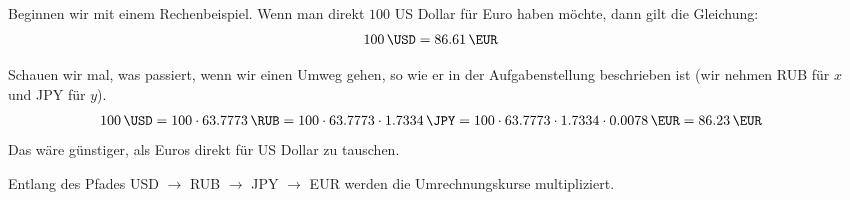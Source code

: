 \documentclass[
a4paper, %
11pt,
]
{scrartcl}
\begin{document}
Beginnen wir mit einem Rechenbeispiel. Wenn man direkt $100$ US Dollar für Euro
haben möchte, dann gilt die Gleichung:
\begin{align*}
  \SI{100}{\USD} & = \SI{86,61}{\EUR}
\end{align*}

Schauen wir mal, was passiert, wenn wir einen Umweg gehen, so wie er in der
Aufgabenstellung beschrieben ist (wir nehmen RUB für $x$ und JPY für $y$).
\begin{align*}
  \SI{100}{\USD} &
    = 100 \cdot \SI{63,7773}{\RUB}
    = 100 \cdot \num{63,7773} \cdot \SI{1,7334}{\JPY}
    = 100 \cdot \num{63,7773} \cdot \num{1,7334} \cdot \SI{0,0078}{\EUR}
    = \SI{86,23}{\EUR}
\end{align*}
Das wäre günstiger, als Euros direkt für US Dollar zu tauschen.

Entlang des Pfades USD $\rightarrow$ RUB $\rightarrow$ JPY $\rightarrow$ EUR
werden die Umrechnungskurse multipliziert.
\end{document}
